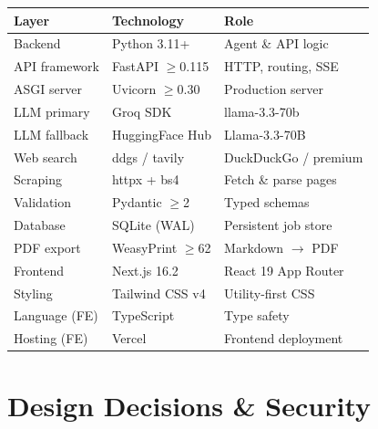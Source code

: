 \documentclass[10pt, twocolumn]{article}
\begin{document}
\begin{center}
\small
\begin{tabular}{p{1.7cm} p{2.1cm} p{2.5cm}}
  \toprule
  \textbf{Layer} & \textbf{Technology} & \textbf{Role} \\
  \midrule
  Backend        & Python 3.11+        & Agent \& API logic \\
  API framework  & FastAPI $\geq$0.115 & HTTP, routing, SSE \\
  ASGI server    & Uvicorn $\geq$0.30  & Production server \\
  LLM primary    & Groq SDK            & llama-3.3-70b \\
  LLM fallback   & HuggingFace Hub     & Llama-3.3-70B \\
  Web search     & ddgs / tavily       & DuckDuckGo / premium \\
  Scraping       & httpx + bs4         & Fetch \& parse pages \\
  Validation     & Pydantic $\geq$2    & Typed schemas \\
  Database       & SQLite (WAL)        & Persistent job store \\
  PDF export     & WeasyPrint $\geq$62 & Markdown $\to$ PDF \\
  Frontend       & Next.js 16.2        & React 19 App Router \\
  Styling        & Tailwind CSS v4     & Utility-first CSS \\
  Language (FE)  & TypeScript          & Type safety \\
  Hosting (FE)   & Vercel              & Frontend deployment \\
  \bottomrule
\end{tabular}
\end{center}

\section{Design Decisions \& Security}
\end{document}
